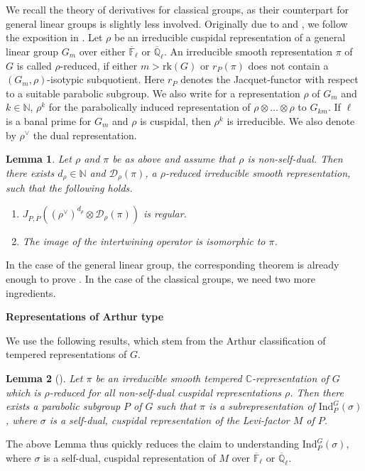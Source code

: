 \documentclass[10pt,a4paper]{article}
\newtheorem{lemma}{Lemma}
\theoremstyle{remark}
\theoremstyle{definition}
\newcommand{\fl}{{\overline{\mathbb{F}}_\ell}}
\newcommand{\ql}{{\overline{\mathbb{Q}}_\ell}}
\newcommand{\ip}{\mathrm{Ind}_P^G}
\newcommand{\op}{\overline{P}}
\newcommand{\NN}{\mathbb{N}}
\newcommand{\dr}{\mathcal{D}_\rho}
\newcommand{\rk}{\mathrm{rk}}
\newcommand{\CC}{\mathbb{C}}
\begin{document}
We recall the theory of derivatives for classical groups, as their counterpart for general linear groups is slightly less involved. Originally due to \cite{Jader} and \cite{Min08}, we follow the exposition in \cite{atobe2024local}.
Let $\rho$ be an irreducible cuspidal representation of a general linear group $G_m$ over either $\fl$ or $\ql$. An irreducible smooth representation $\pi$ of $G$ is called $\rho$-reduced, if either $m>\rk(G)$ or $r_{P}(\pi)$ does not contain a $(G_m,\rho)$-isotypic subquotient. Here $r_P$ denotes the Jacquet-functor with respect to a suitable parabolic subgroup.
We also write for a representation $\rho$ of $G_m$ and $k\in\NN$,  $
\rho^k$ for the parabolically induced representation of $\rho\otimes\ldots\otimes\rho$ to $G_{km}$. If $\ell$ is a banal prime for $G_m$ and $\rho$ is cuspidal, then $\rho^k$ is irreducible.
We also denote by $\rho^\lor$ the dual representation.
\begin{lemma}
    Let $\rho$ and $\pi$ be as above and assume that $\rho$ is non-self-dual. Then there exists $d_\rho\in\NN$ and $\dr(\pi)$, a $\rho$-reduced irreducible smooth representation, such that the following holds.
    \begin{enumerate}
        \item $J_{P,\op}((\rho^\lor)^{d_\rho}\otimes\dr(\pi))$ is regular.
        \item The image of the intertwining operator is isomorphic to $\pi$.
    \end{enumerate}
    \end{lemma}
In the case of the general linear group, the corresponding theorem is already enough to prove . In the case of the classical groups, we need two more ingredients.
    
\textbf{Representations of Arthur type}

We use the following results, which stem from the Arthur classification of tempered representations of $G$.
\begin{lemma}[{\cite[§5.3]{AtobeMinguez2020}}]
    Let $\pi$ be an irreducible smooth tempered $\CC$-representation of $G$ which is $\rho$-reduced for all non-self-dual cuspidal representations $\rho$.
    Then there exists a parabolic subgroup $P$ of $G$ such that $\pi$ is a subrepresentation of $\ip(\sigma)$, where $\sigma$ is a self-dual, cuspidal representation of the Levi-factor $M$ of $P$.
\end{lemma}
The above Lemma thus quickly reduces the claim to understanding $\ip(\sigma)$, where $\sigma$ is a self-dual, cuspidal representation of $M$ over $\fl$ or $\ql$. 
\end{document}
